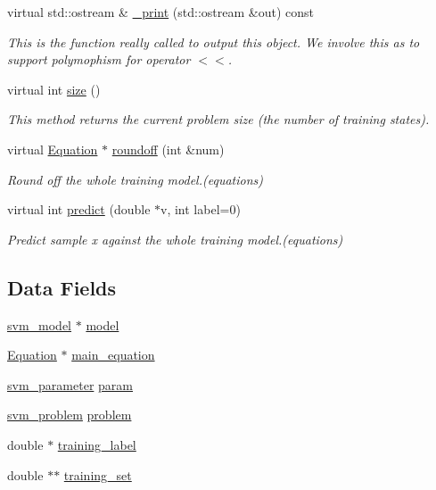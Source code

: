 \begin{DoxyCompactItemize}
virtual std\+::ostream \& \hyperlink{classSVM_a6e5a3fbae4da1ecd4773173a2b590c21}{\+\_\+print} (std\+::ostream \&out) const 
\begin{DoxyCompactList}\small\item\em This is the function really called to output this object. We involve this as to support polymophism for operator $<$$<$. \end{DoxyCompactList}\item 
virtual int \hyperlink{classSVM_a4563cef982f6e1c67acf0c7b0ec8909b}{size} ()
\begin{DoxyCompactList}\small\item\em This method returns the current problem size (the number of training states). \end{DoxyCompactList}\item 
virtual \hyperlink{classEquation}{Equation} $\ast$ \hyperlink{classSVM_abd2d511c6cb9f64a29a4551f6435bfd2}{roundoff} (int \&num)
\begin{DoxyCompactList}\small\item\em Round off the whole training model.(equations) \end{DoxyCompactList}\item 
virtual int \hyperlink{classSVM_a972215d3c749ba550c85763c8871567f}{predict} (double $\ast$v, int label=0)
\begin{DoxyCompactList}\small\item\em Predict sample x against the whole training model.(equations) \end{DoxyCompactList}\end{DoxyCompactItemize}
\subsection*{Data Fields}
\begin{DoxyCompactItemize}
\item 
\hyperlink{structsvm__model}{svm\+\_\+model} $\ast$ \hyperlink{classSVM_a546f3dfe2004cbf9096105a67b0a0e66}{model}
\item 
\hyperlink{classEquation}{Equation} $\ast$ \hyperlink{classSVM_ae7e7d62512de9800ea1c47fc7ad33adc}{main\+\_\+equation}
\item 
\hyperlink{structsvm__parameter}{svm\+\_\+parameter} \hyperlink{classSVM_ad28af66070f8e9f9f6c74132c78aa245}{param}
\item 
\hyperlink{structsvm__problem}{svm\+\_\+problem} \hyperlink{classSVM_a154369e018e4f487838709b350474bc6}{problem}
\item 
double $\ast$ \hyperlink{classSVM_a4a2cfc7a3b8b1e65a8edd81ffc0985ba}{training\+\_\+label}
\item 
double $\ast$$\ast$ \hyperlink{classSVM_a0d63a10c574ace471efcd8e6553b7bd9}{training\+\_\+set}
\end{DoxyCompactItemize}
